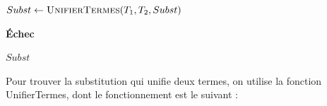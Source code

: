 \documentclass[11pt]{article}
\begin{document}
\begin{algorithm}[H]
\begin{algorithmic}[1]
            \State {}
            \State $Subst \gets \Call{UnifierTermes}{T_1, T_2, Subst}$ 
            
                \State \Return \textbf{Échec} 
            \EndIf
        \EndFor
        
        \State \Return $Subst$ 
    \EndProcedure

\end{algorithmic}
\end{algorithm}


\vspace{0.2cm}
Pour trouver la substitution qui unifie deux termes, on utilise la fonction UnifierTermes, dont le fonctionnement est le suivant :
\end{document}
